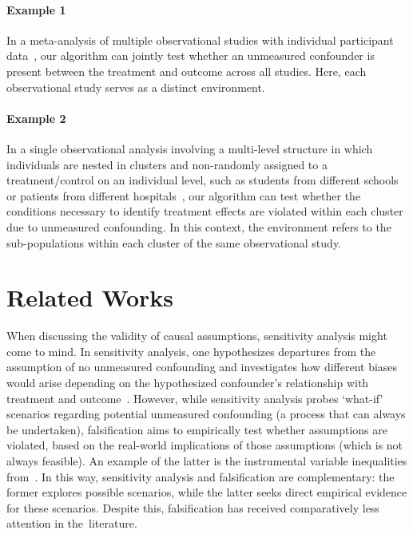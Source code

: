 \documentclass{article}
\begin{document}
\paragraph{Example 1}
In a meta-analysis of multiple observational studies with individual participant data~\citep{riley2010meta}, our algorithm can jointly test whether an unmeasured confounder is present between the treatment and outcome across all studies. Here, each observational study serves as a distinct environment.

\paragraph{Example 2}
In a single observational analysis involving a multi-level structure in which individuals are nested in clusters and non-randomly assigned to a treatment/control on an individual level, such as students from different schools~\citep{leite2015evaluation} or patients from different hospitals~\citep{goldstein2002multilevel}, our algorithm can test whether the conditions necessary to identify treatment effects are violated within each cluster due to unmeasured confounding. In this context, the environment refers to the sub-populations within each cluster of the same observational study.

\section{Related Works}

When discussing the validity of causal assumptions, sensitivity analysis might come to mind. In sensitivity analysis, one hypothesizes departures from the assumption of no unmeasured confounding and investigates how different biases would arise depending on the hypothesized confounder's relationship with treatment and outcome~\citep{cornfield1959smoking, tan2006distributional, vanderweele2017sensitivity}. However, while sensitivity analysis probes `what-if' scenarios regarding potential unmeasured confounding (a process that can always be undertaken), falsification aims to empirically test whether assumptions are violated, based on the real-world implications of those assumptions (which is not always feasible). An example of the latter is the instrumental variable inequalities from~\citet{pearl1995testability}. In this way, sensitivity analysis and falsification are complementary: the former explores possible scenarios, while the latter seeks direct empirical evidence for these scenarios. Despite this, falsification has received comparatively less attention in the~literature.
\end{document}
